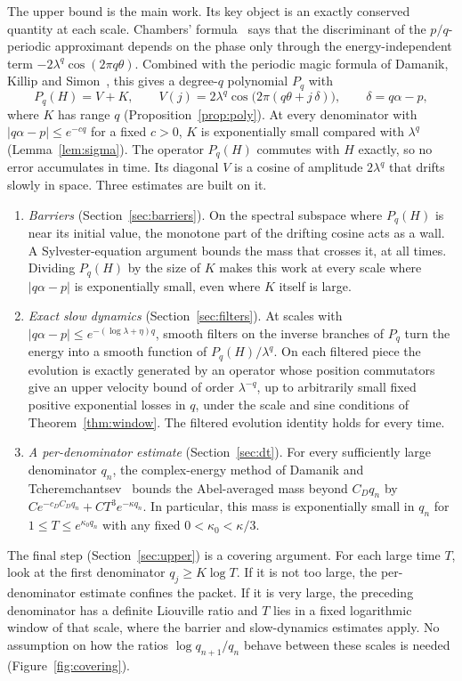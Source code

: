The upper bound is the main work. Its key object is an exactly conserved quantity at each scale. Chambers' formula~\cite{Chambers1965} says that the discriminant of the $p/q$-periodic approximant depends on the phase only through the energy-independent term $-2\lambda^q\cos(2\pi q\theta)$. Combined with the periodic magic formula of Damanik, Killip and Simon~\cite{DKS2010}, this gives a degree-$q$ polynomial $P_q$ with
\[
P_q(H)=V+K,\qquad V(j)=2\lambda^q\cos\bigl(2\pi(q\theta+j\,\delta)\bigr),\qquad \delta=q\alpha-p,
\]
where $K$ has range $q$ (Proposition~\ref{prop:poly}). At every denominator with $|q\alpha-p|\le e^{-cq}$ for a fixed $c>0$, $K$ is exponentially small compared with $\lambda^q$ (Lemma~\ref{lem:sigma}). The operator $P_q(H)$ commutes with $H$ exactly, so no error accumulates in time. Its diagonal $V$ is a cosine of amplitude $2\lambda^q$ that drifts slowly in space. Three estimates are built on it.
\begin{enumerate}
\item \emph{Barriers} (Section~\ref{sec:barriers}). On the spectral subspace where $P_q(H)$ is near its initial value, the monotone part of the drifting cosine acts as a wall. A Sylvester-equation argument bounds the mass that crosses it, at all times. Dividing $P_q(H)$ by the size of $K$ makes this work at every scale where $|q\alpha-p|$ is exponentially small, even where $K$ itself is large.
\item \emph{Exact slow dynamics} (Section~\ref{sec:filters}). At scales with $|q\alpha-p|\le e^{-(\log\lambda+\eta)q}$, smooth filters on the inverse branches of $P_q$ turn the energy into a smooth function of $P_q(H)/\lambda^q$. On each filtered piece the evolution is exactly generated by an operator whose position commutators give an upper velocity bound of order $\lambda^{-q}$, up to arbitrarily small fixed positive exponential losses in $q$, under the scale and sine conditions of Theorem~\ref{thm:window}. The filtered evolution identity holds for every time.
\item \emph{A per-denominator estimate} (Section~\ref{sec:dt}). For every sufficiently large denominator $q_n$, the complex-energy method of Damanik and Tcheremchantsev~\cite{DT2007} bounds the Abel-averaged mass beyond $C_Dq_n$ by $Ce^{-c_D C_Dq_n}+CT^3e^{-\kappa q_n}$. In particular, this mass is exponentially small in $q_n$ for $1\le T\le e^{\kappa_0q_n}$ with any fixed $0<\kappa_0<\kappa/3$.
\end{enumerate}
The final step (Section~\ref{sec:upper}) is a covering argument. For each large time $T$, look at the first denominator $q_j\ge K\log T$. If it is not too large, the per-denominator estimate confines the packet. If it is very large, the preceding denominator has a definite Liouville ratio and $T$ lies in a fixed logarithmic window of that scale, where the barrier and slow-dynamics estimates apply. No assumption on how the ratios $\log q_{n+1}/q_n$ behave between these scales is needed (Figure~\ref{fig:covering}).

